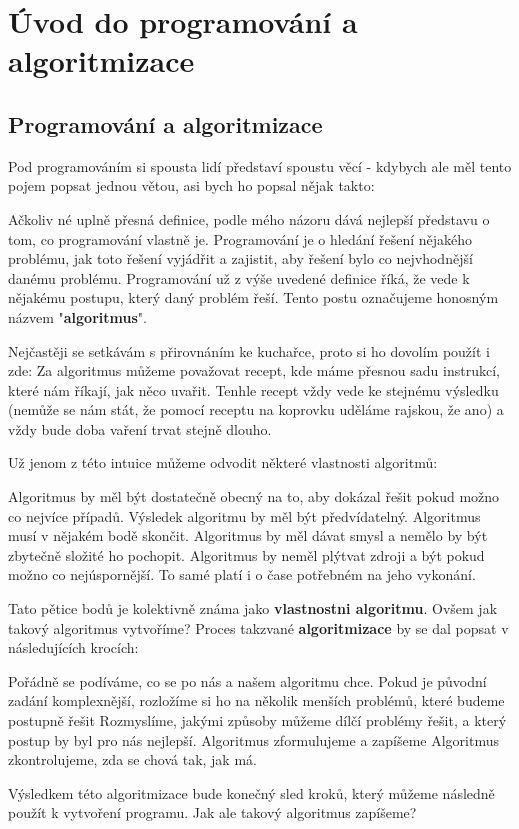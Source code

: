 \chapter{Úvod do programování a algoritmizace}
\section{Programování a algoritmizace}
Pod programováním si spousta lidí představí spoustu věcí - kdybych ale měl tento pojem popsat jednou větou, asi bych ho popsal nějak takto:

Ačkoliv né uplně přesná definice, podle mého názoru dává nejlepší představu o tom, co programování vlastně je. Programování je o hledání řešení nějakého problému, jak toto řešení vyjádřit a zajistit, aby řešení bylo co nejvhodnější danému problému. Programování už z výše uvedené definice říká, že vede k nějakému postupu, který daný problém řeší. Tento postu označujeme honosným názvem "\textbf{algoritmus}".

Nejčastěji se setkávám s přirovnáním ke kuchařce, proto si ho dovolím použít i zde: Za algoritmus můžeme považovat recept, kde máme přesnou sadu instrukcí, které nám říkají, jak něco uvařit. Tenhle recept vždy vede ke stejnému výsledku (nemůže se nám stát, že pomocí receptu na koprovku uděláme rajskou, že ano) a vždy bude doba vaření trvat stejně dlouho.

Už jenom z této intuice můžeme odvodit některé vlastnosti algoritmů:
\noindent
\begin{enumerate}
	 Algoritmus by měl být dostatečně obecný na to, aby dokázal řešit pokud možno co nejvíce případů.
	 Výsledek algoritmu by měl být předvídatelný.
	 Algoritmus musí v nějakém bodě skončit.
	 Algoritmus by měl dávat smysl a nemělo by být zbytečně složité ho pochopit.
	 Algoritmus by neměl plýtvat zdroji a být pokud možno co nejúspornější. To samé platí i o čase potřebném na jeho vykonání.
\end{enumerate}

Tato pětice bodů je kolektivně známa jako \textbf{vlastnostni algoritmu}. Ovšem jak takový algoritmus vytvoříme? Proces takzvané \textbf{algoritmizace} by se dal popsat v následujících krocích:
\begin{enumerate}
	 Pořádně se podíváme, co se po nás a našem algoritmu chce.
	 Pokud je původní zadání komplexnější, rozložíme si ho na několik menších problémů, které budeme postupně řešit
	 Rozmyslíme, jakými způsoby můžeme dílčí problémy řešit, a který postup by byl pro nás nejlepší.  
	  Algoritmus zformulujeme a zapíšeme
	 Algoritmus zkontrolujeme, zda se chová tak, jak má.
\end{enumerate}
Výsledkem této algoritmizace bude konečný sled kroků, který můžeme následně použít k vytvoření programu. Jak ale takový algoritmus zapíšeme? 

